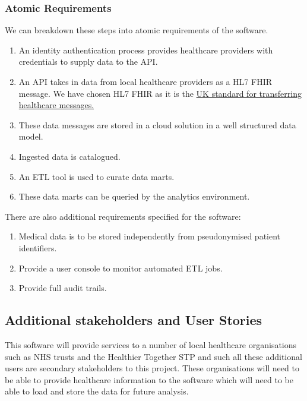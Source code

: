 \documentclass[10pt]{article}
\begin{document}
\subsubsection{Atomic Requirements}\label{atomic-requirements}

We can breakdown these steps into atomic requirements of the software.

\begin{enumerate}
\def\labelenumi{\arabic{enumi}.}
\itemsep1pt\parskip0pt
\item	
An identity authentication process provides healthcare providers with	
credentials to supply data to the API.
\item
  An API takes in data from local healthcare providers as a HL7 FHIR
  message. We have chosen HL7 FHIR as it is the
  \href{https://digital.nhs.uk/services/fhir-uk-core}{UK   standard
  for
 transferring healthcare messages.}
\item
  These data messages are stored in a cloud solution in a well
  structured data model.
\item
  Ingested data is catalogued.
\item
  An ETL tool is used to curate data marts.
\item
  These data marts can be queried by the analytics environment.
\end{enumerate}

There are also additional requirements specified for the software:

\begin{enumerate}
\def\labelenumi{\arabic{enumi}.}
\itemsep1pt\parskip0pt
\item
  Medical data is to be stored independently from pseudonymised patient
  identifiers.
\item
  Provide a user console to monitor automated ETL jobs.
\item
  Provide full audit trails.
\end{enumerate}

\subsection{Additional stakeholders and User
Stories}\label{additional-stakeholders-and-user-stories}

This software will provide services to a number of local healthcare
organisations such as NHS trusts and the Healthier Together STP and such
all these additional users are secondary stakeholders to this project.
These organisations will need to be able to provide healthcare
information to the software which will need to be able to load and store
the data for future analysis.
\end{document}
